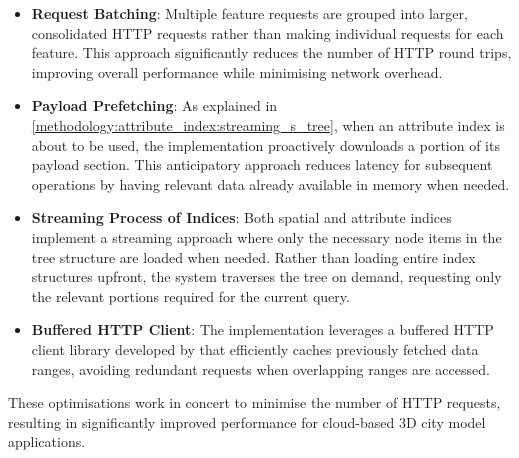 \begin{itemize}
  \item \textbf{Request Batching}: Multiple feature requests are grouped into larger, consolidated HTTP requests rather than making individual requests for each feature. This approach significantly reduces the number of HTTP round trips, improving overall performance while minimising network overhead.
  \item \textbf{Payload Prefetching}: As explained in \autoref{methodology:attribute_index:streaming_s_tree}, when an attribute index is about to be used, the implementation proactively downloads a portion of its payload section. This anticipatory approach reduces latency for subsequent operations by having relevant data already available in memory when needed.

  \item \textbf{Streaming Process of Indices}: Both spatial and attribute indices implement a streaming approach where only the necessary node items in the tree structure are loaded when needed. Rather than loading entire index structures upfront, the system traverses the tree on demand, requesting only the relevant portions required for the current query.

  \item \textbf{Buffered HTTP Client}: The implementation leverages a buffered HTTP client library developed by \citet{buffered_http_range_client} that efficiently caches previously fetched data ranges, avoiding redundant requests when overlapping ranges are accessed.

\end{itemize}

These optimisations work in concert to minimise the number of HTTP requests, resulting in significantly improved performance for cloud-based 3D city model applications.
